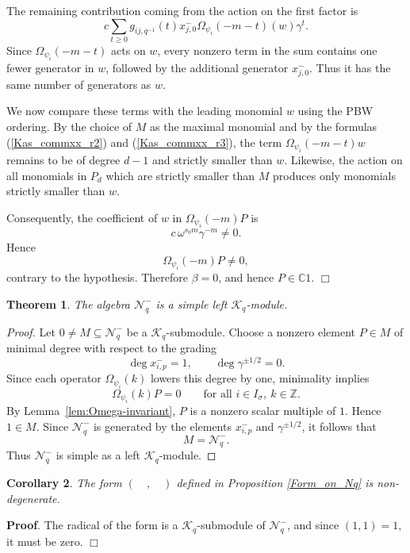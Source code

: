 \documentclass[12pt]{amsart}
\newtheorem{thm}{Theorem}[section]
\newtheorem{cor}[thm]{Corollary}
\numberwithin{equation}{section}
\newcommand{\dem }{\noindent\textbf{Proof}. }
\newcommand{\findem }{\hfill $\Box$ \vskip0.5cm }
\newcommand{\mc}[1]{\mathcal{#1}}
\begin{document}
The remaining contribution coming from the action on the first
factor is
\[
c\sum_{t\geq0}
g_{ij,q^{-1}}(t)
x^-_{j,0}
\Omega_{\psi_i}(-m-t)(w)\gamma^t.
\]
Since $\Omega_{\psi_i}(-m-t)$ acts on $w$, every nonzero term in
the sum contains one fewer generator in $w$, followed by the
additional generator $x^-_{j,0}$. Thus it has the same number of
generators as $w$.

We now compare these terms with the leading monomial $w$ using the
PBW ordering. By the choice of $M$ as the maximal monomial and by
the formulas (\ref{Kas_commxx_r2}) and (\ref{Kas_commxx_r3}), the term $\Omega_{\psi_i}(-m-t)w$ remains to be of degree $d-1$ and  strictly smaller than $w$. Likewise, the action on all monomials in $P_d$ which are strictly
smaller than $M$ produces only monomials strictly smaller than $w$.

Consequently, the coefficient of $w$ in
$\Omega_{\psi_i}(-m)P$ is
\[
c\,\omega^{s_0m}\gamma^{-m}\neq0.
\]
Hence
\[
\Omega_{\psi_i}(-m)P\neq0,
\]
contrary to the hypothesis. Therefore $\beta=0$, and hence $P\in\mathbb C1$.
\findem





\begin{thm}
The algebra $\mc{N}_q^-$ is a simple left $\mc{K}_q$-module.
\end{thm}

\begin{proof}
Let $0\neq M\subseteq\mc{N}_q^-$ be a $\mc{K}_q$-submodule.
Choose a nonzero element $P\in M$ of minimal degree with respect to
the grading
\[
\deg x^-_{i,p}=1,\qquad
\deg\gamma^{\pm1/2}=0.
\]
Since each operator $\Omega_{\psi_i}(k)$ lowers this degree by one,
minimality implies
\[
\Omega_{\psi_i}(k)P=0
\qquad
\text{for all }i\in I_\sigma,\ k\in\mathbb Z.
\]
By Lemma~\ref{lem:Omega-invariant}, $P$ is a nonzero scalar
multiple of $1$. Hence $1\in M$. Since $\mc{N}_q^-$ is generated by
the elements $x^-_{i,p}$ and $\gamma^{\pm1/2}$, it follows that
\[
M=\mc{N}_q^-.
\]
Thus $\mc{N}_q^-$ is simple as a left $\mc{K}_q$-module.
\end{proof}
\begin{cor}
    The form $(\quad,\quad)$ defined in Proposition \ref{Form_on_Nq} is non-degenerate.
\end{cor}

\dem The radical of the form is a $\mc{K}_q$-submodule of $\mc{N}_q^-$, and since $(1,1)=1$, it must be zero.
\findem
\end{document}

